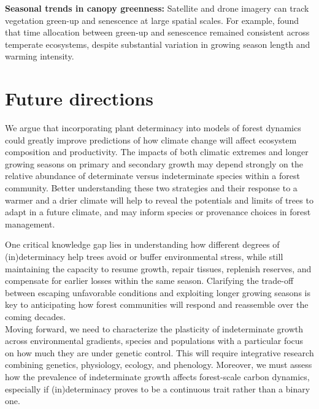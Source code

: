 \documentclass{article}
\begin{document}
\begin{tcolorbox}
			\textbf{Seasonal trends in canopy greenness:} Satellite and drone imagery can track vegetation green-up and senescence at large spatial scales. For example, \citet{mengConsistentTimeAllocation2024} found that time allocation between green-up and senescence remained consistent across temperate ecosystems, despite substantial variation in growing season length and warming intensity.\\
			

	\end{tcolorbox}
	
	
\section*{Future directions}
We argue that incorporating plant determinacy into models of forest dynamics could greatly improve predictions of how climate change will affect ecosystem composition and productivity. The impacts of both climatic extremes and longer growing seasons on primary and secondary growth may depend strongly on the relative abundance of determinate versus indeterminate species within a forest community. Better understanding these two strategies and their response to a warmer and a drier climate will help to reveal the potentials and limits of trees to adapt in a future climate, and may inform species or provenance choices in forest management.

One critical knowledge gap lies in understanding how different degrees of (in)determinacy help trees avoid or buffer environmental stress, while still maintaining the capacity to resume growth, repair tissues, replenish reserves, and compensate for earlier losses within the same season. Clarifying the trade-off between escaping unfavorable conditions and exploiting longer growing seasons is key to anticipating how forest communities will respond and reassemble over the coming decades.\\

Moving forward, we need to characterize the plasticity of indeterminate growth across environmental gradients, species and populations with a particular focus on how much they are under genetic control. 
This will require integrative research combining genetics, physiology, ecology, and phenology. Moreover, we must assess how the prevalence of indeterminate growth affects forest-scale carbon dynamics, especially if (in)determinacy proves to be a continuous trait rather than a binary one. 
\end{document}
